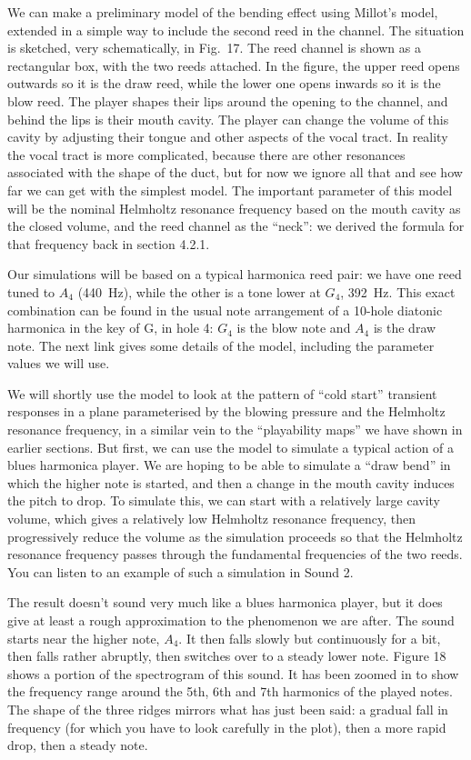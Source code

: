   We can make a preliminary model of the bending effect using Millot’s model, 
  extended in a simple way to include the second reed in the channel. The 
  situation is sketched, very schematically, in Fig.\ 17. The reed channel is 
  shown as a rectangular box, with the two reeds attached. In the figure, the 
  upper reed opens outwards so it is the draw reed, while the lower one opens 
  inwards so it is the blow reed. The player shapes their lips around the 
  opening to the channel, and behind the lips is their mouth cavity. The player 
  can change the volume of this cavity by adjusting their tongue and other 
  aspects of the vocal tract. In reality the vocal tract is more complicated, 
  because there are other resonances associated with the shape of the duct, but 
  for now we ignore all that and see how far we can get with the simplest 
  model. The important parameter of this model will be the nominal Helmholtz 
  resonance frequency based on the mouth cavity as the closed volume, and the 
  reed channel as the “neck”: we derived the formula for that frequency back in 
  section 4.2.1. 

  Our simulations will be based on a typical harmonica reed pair: we have one 
  reed tuned to $A_4$ (440~Hz), while the other is a tone lower at $G_4$, 
  392~Hz. This exact combination can be found in the usual note arrangement of 
  a 10-hole diatonic harmonica in the key of G, in hole 4: $G_4$ is the blow 
  note and $A_4$ is the draw note. The next link gives some details of the 
  model, including the parameter values we will use. 

  We will shortly use the model to look at the pattern of “cold start” 
  transient responses in a plane parameterised by the blowing pressure and the 
  Helmholtz resonance frequency, in a similar vein to the “playability maps” we 
  have shown in earlier sections. But first, we can use the model to simulate a 
  typical action of a blues harmonica player. We are hoping to be able to 
  simulate a “draw bend” in which the higher note is started, and then a change 
  in the mouth cavity induces the pitch to drop. To simulate this, we can start 
  with a relatively large cavity volume, which gives a relatively low Helmholtz 
  resonance frequency, then progressively reduce the volume as the simulation 
  proceeds so that the Helmholtz resonance frequency passes through the 
  fundamental frequencies of the two reeds. You can listen to an example of 
  such a simulation in Sound 2. 

  The result doesn’t sound very much like a blues harmonica player, but it does 
  give at least a rough approximation to the phenomenon we are after. The sound 
  starts near the higher note, $A_4$. It then falls slowly but continuously for 
  a bit, then falls rather abruptly, then switches over to a steady lower note. 
  Figure 18 shows a portion of the spectrogram of this sound. It has been 
  zoomed in to show the frequency range around the 5th, 6th and 7th harmonics 
  of the played notes. The shape of the three ridges mirrors what has just been 
  said: a gradual fall in frequency (for which you have to look carefully in 
  the plot), then a more rapid drop, then a steady note. 

